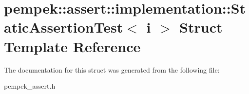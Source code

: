 \hypertarget{structpempek_1_1assert_1_1implementation_1_1_static_assertion_test}{}\section{pempek\+:\+:assert\+:\+:implementation\+:\+:Static\+Assertion\+Test$<$ i $>$ Struct Template Reference}
\label{structpempek_1_1assert_1_1implementation_1_1_static_assertion_test}


The documentation for this struct was generated from the following file\+:\begin{DoxyCompactItemize}
\item 
pempek\+\_\+assert.\+h\end{DoxyCompactItemize}
